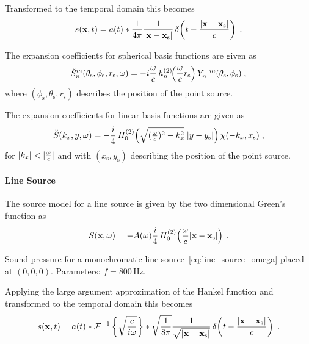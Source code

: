 Transformed to the temporal domain this becomes
%
\begin{equation}
    s(\x,t) = a(t) * \frac{1}{4\pi} \frac{1}{|\x-\xs|}
    \deltafunc{t - \frac{|\x-\xs|}{c}}
    \qp
    \label{point_source_t}
\end{equation}
%

The expansion coefficients for spherical basis functions are given
as\autocite[][(2.37)]{Ahrens2012}
%
\begin{equation}
    \breve{S}_n^m(\theta_\text{s},\phi_\text{s},r_\text{s},\omega) =
    -i \omegac \, h_n^{(2)}\!\!\left(\omegac r_\text{s}\right)
    Y_n^{-m}(\theta_\text{s},\phi_\text{s}) \qc
    \label{eq:point_source_spherical}
\end{equation}
%
where $(\phi_\text{s},\theta_\text{s},r_\text{s})$ describes the position of the
point source.

The expansion coefficients for linear basis functions are given
as\autocite[][(C.10)]{Ahrens2012}
%
\begin{equation}
    \breve{S}(k_x,y,\omega) =
    -\frac{i}{4} \H{0}{2} \left( \sqrt{(\tfrac{\omega}{c})^2-k_x^2} \;
        |y-y_\text{s}| \right) \chi(-k_x,x_\text{s}) \qc
    \label{eq:point_source_linear}
\end{equation}
%
for $|k_x|<|\omegac|$ and with $(x_\text{s},y_\text{s})$ describing the position
of the point source.


\paragraph{Line Source}
\label{sec:line_source}
%
The source model for a line source is given by the two dimensional Green's
function as
%
\begin{equation}
    S(\x,\omega) = -A(\omega) \frac{i}{4} \H{0}{2} \left(\omegac |\x-\xs|\right)
    \qp
    \label{eq:line_source_omega}
\end{equation}
%
\begin{marginfigure}
    \centering
    \ft
    
    \caption{Sound pressure for a monochromatic line
        source~\eqref{eq:line_source_omega} placed at $(0,0,0)$. Parameters: $f =
        800$\,Hz.
        }
\end{marginfigure}
%
Applying the large argument approximation of the Hankel
function and transformed to
the temporal domain this becomes
%
\begin{equation}
    s(\x,t) = a(t) * \IFT{\sqrt{\frac{c}{i\omega}}} * \sqrt{\frac{1}{8\pi}} \frac{1}{\sqrt{|\x-\xs|}}
    \deltafunc{t - \frac{|\x-\xs|}{c}}
    \qp
    \label{line_source_t}
\end{equation}
%

